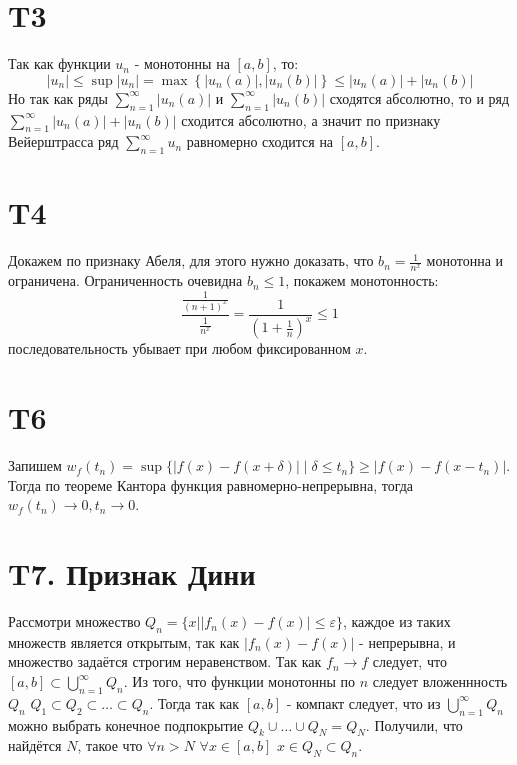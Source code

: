 \documentclass[12pt]{article}
\begin{document}
\section{T3}
Так как функции $u_n$ - монотонны на $[a, b]$, то: 
\[
    \left\vert u_n \right\vert \leq \sup \left\vert u_n \right\vert = \max \left\{ \left\vert u_n(a) \right\vert , \left\vert u_n(b) \right\vert  \right\} \leq
    \left\vert u_n(a) \right\vert + \left\vert u_n(b) \right\vert
\]
Но так как ряды $\sum_{n=1}^{\infty} \left\vert u_n(a) \right\vert$ и $\sum_{n=1}^{\infty} \left\vert u_n(b) \right\vert$ сходятся абсолютно, то 
и ряд $\sum_{n=1}^{\infty} \left\vert u_n(a) \right\vert + \left\vert u_n(b) \right\vert$ сходится абсолютно, а значит по признаку 
Вейерштрасса ряд $\sum_{n=1}^{\infty} u_n$ равномерно сходится на $[a, b]$.   

\section{T4}
Докажем по признаку Абеля, для этого нужно доказать, что $b_n = \frac{1}{n^x}$ монотонна и ограничена. 
Ограниченность очевидна $b_n \leq 1$, покажем монотонность: 
\[
    \frac{\frac{1}{(n+1)^x}}{\frac{1}{n^x}} = \frac{1}{\left( 1 + \frac{1}{n} \right)^x } \leq 1 
\] 
последовательность убывает при любом фиксированном $x$. 

\section{T6}
Запишем $w_f(t_n) = \sup \{\vert f(x) - f(x + \delta ) \vert \mid \delta \leq  t_n\} \geq \vert f(x) - f(x - t_n) \vert $. 
Тогда по теореме Кантора функция равномерно-непрерывна, тогда $w_f(t_n) \to 0, t_n \to 0$.   
\section{T7. Признак Дини}
Рассмотри множество $Q_n = \{x \mid \vert f_n(x) - f(x) \vert \leq \varepsilon\}$, 
каждое из таких множеств является открытым, так как $\vert f_n(x) - f(x) \vert$ - непрерывна, и 
множество задаётся строгим неравенством. Так как $f_n \to f$ следует, что $[a, b] \subset \bigcup_{n=1}^{\infty} Q_n$. 
Из того, что функции монотонны по $n$ следует вложеннность $Q_n$ $Q_1 \subset Q_2 \subset \dots \subset Q_n$.
Тогда так как $[a, b]$ - компакт следует, что из $\bigcup_{n=1}^{\infty} Q_n$ можно выбрать конечное подпокрытие 
$Q_k \cup \dots \cup Q_N = Q_N$. Получили, что найдётся $N$, такое что $\forall n > N$ $\forall x \in [a, b]$ $x \in Q_N \subset Q_n$.              
\end{document}
